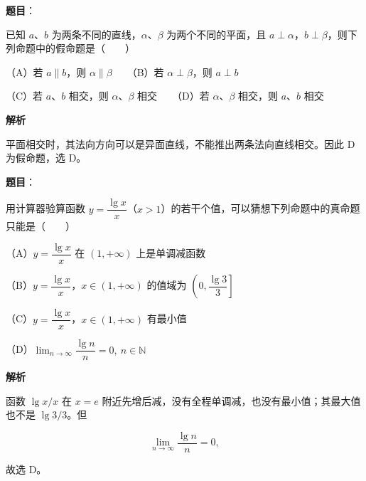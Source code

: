 \begin{answer}

\textbf{题目}：

已知 $a$、$b$ 为两条不同的直线，$\alpha$、$\beta$ 为两个不同的平面，且 $a\perp\alpha$，$b\perp\beta$，则下列命题中的假命题是\mbox{（　　）}

（A）若 $a\parallel b$，则 $\alpha\parallel\beta$　　（B）若 $\alpha\perp\beta$，则 $a\perp b$

（C）若 $a$、$b$ 相交，则 $\alpha$、$\beta$ 相交　　（D）若 $\alpha$、$\beta$ 相交，则 $a$、$b$ 相交

\textbf{解析}

平面相交时，其法向方向可以是异面直线，不能推出两条法向直线相交。因此 D 为假命题，选 D。


\end{answer}
\begin{answer}

\textbf{题目}：

用计算器验算函数 $y=\dfrac{\lg x}{x}$（$x>1$）的若干个值，可以猜想下列命题中的真命题只能是\mbox{（　　）}

（A）$y=\dfrac{\lg x}{x}$ 在 $(1,+\infty)$ 上是单调减函数

（B）$y=\dfrac{\lg x}{x}$，$x\in(1,+\infty)$ 的值域为 $\left(0,\dfrac{\lg3}{3}\right]$

（C）$y=\dfrac{\lg x}{x}$，$x\in(1,+\infty)$ 有最小值

（D）$\displaystyle\lim_{n\to\infty}\dfrac{\lg n}{n}=0,\ n\in\mathbb N$

\textbf{解析}

函数 $\lg x/x$ 在 $x=e$ 附近先增后减，没有全程单调减，也没有最小值；其最大值也不是 $\lg3/3$。但

\nopagebreak[4]
\[
\lim_{n\to\infty}\frac{\lg n}{n}=0,
\]

故选 D。


\end{answer}

